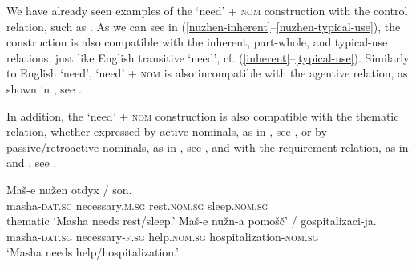 \documentclass[output=paper]{langscibook}
\begin{document}
We have already seen examples of the `need' + \textsc{nom} construction with the control relation, such as . As we can see in (\ref{nuzhen-inherent}--\ref{nuzhen-typical-use}), the construction is also compatible with the inherent, part-whole, and typical-use relations, just like English transitive `need', cf. (\ref{inherent}--\ref{typical-use}). Similarly to English `need', `need' + \textsc{nom} is also incompatible with the agentive relation, as shown in , see .

\ea \label{nuzhen-R}
\z\z

\noindent In addition, the `need' + \textsc{nom} construction is also compatible with the thematic relation, whether expressed by active nominals, as in , see , or by passive/retroactive nominals, as in , see , and with the requirement relation, as in  and , see .

\ea
\ea \label{nuzhen-active}\gll Maš-e nužen otdyx / son.\\
masha-\textsc{dat.sg} necessary.\textsc{m.sg} rest.\textsc{nom.sg} {} sleep.\textsc{nom.sg}\\ \hfill thematic
\glt `Masha needs rest/sleep.'
\ex \label{nuzhen-passive}\gll Maš-e nužn-a pomošč' / gospitalizaci-ja.\\
masha-\textsc{dat.sg} necessary-\textsc{f.sg} help.\textsc{nom.sg} {}  hospitalization-\textsc{nom.sg}\\
\glt `Masha needs help/hospitalization.'
\z\z
\end{document}
